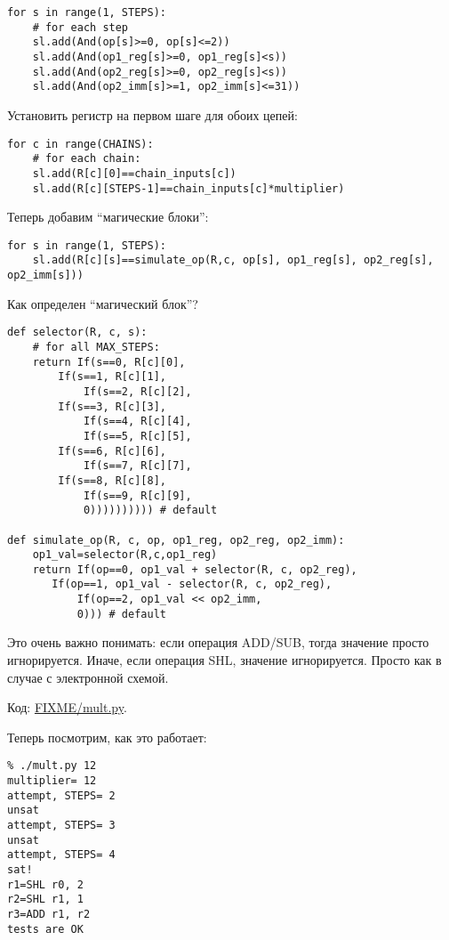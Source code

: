\begin{lstlisting}
for s in range(1, STEPS):
    # for each step
    sl.add(And(op[s]>=0, op[s]<=2))
    sl.add(And(op1_reg[s]>=0, op1_reg[s]<s))
    sl.add(And(op2_reg[s]>=0, op2_reg[s]<s))
    sl.add(And(op2_imm[s]>=1, op2_imm[s]<=31))
\end{lstlisting}

Установить регистр на первом шаге для обоих цепей:

\begin{lstlisting}
for c in range(CHAINS):
    # for each chain:
    sl.add(R[c][0]==chain_inputs[c])
    sl.add(R[c][STEPS-1]==chain_inputs[c]*multiplier)
\end{lstlisting}

Теперь добавим ``магические блоки'':

\begin{lstlisting}
for s in range(1, STEPS):
    sl.add(R[c][s]==simulate_op(R,c, op[s], op1_reg[s], op2_reg[s], op2_imm[s]))
\end{lstlisting}

Как определен ``магический блок''?

\begin{lstlisting}
def selector(R, c, s):
    # for all MAX_STEPS:
    return If(s==0, R[c][0],
	    If(s==1, R[c][1],
            If(s==2, R[c][2],
	    If(s==3, R[c][3],
            If(s==4, R[c][4],
            If(s==5, R[c][5],
	    If(s==6, R[c][6],
            If(s==7, R[c][7],
	    If(s==8, R[c][8],
            If(s==9, R[c][9],
	        0)))))))))) # default

def simulate_op(R, c, op, op1_reg, op2_reg, op2_imm):
    op1_val=selector(R,c,op1_reg)
    return If(op==0, op1_val + selector(R, c, op2_reg),
	   If(op==1, op1_val - selector(R, c, op2_reg),
           If(op==2, op1_val << op2_imm,
	       0))) # default
\end{lstlisting}

Это очень важно понимать: если операция ADD/SUB, тогда значение  просто игнорируется.
Иначе, если операция SHL, значение  игнорируется.
Просто как в случае с электронной схемой.

Код: \url{FIXME/mult.py}.

Теперь посмотрим, как это работает:

\begin{lstlisting}
% ./mult.py 12
multiplier= 12
attempt, STEPS= 2
unsat
attempt, STEPS= 3
unsat
attempt, STEPS= 4
sat!
r1=SHL r0, 2
r2=SHL r1, 1
r3=ADD r1, r2
tests are OK
\end{lstlisting}

